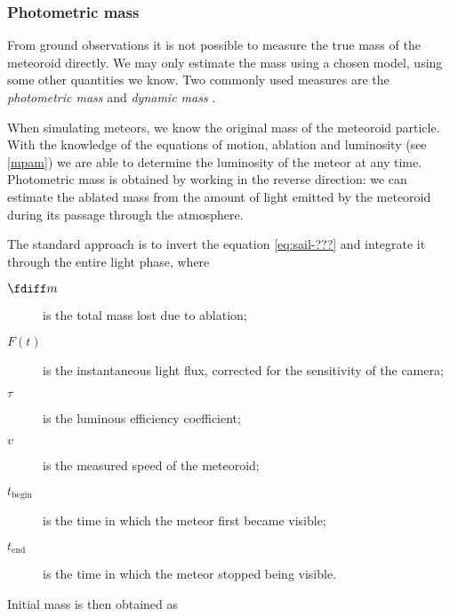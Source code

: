        
        \subsubsection{Photometric mass} \label{msmp}
            From ground observations it is not possible to measure the true mass of the meteoroid directly.
            We may only estimate the mass using a chosen model, using some other quantities we know.
            Two commonly used measures are the \emph{photometric mass} and \emph{dynamic mass} \citep{ceplecha1966}.

            When simulating meteors, we know the original mass of the meteoroid particle.
            With the knowledge of the equations of motion, ablation and luminosity (see \cref{mpam})
            we are able to determine the luminosity of the meteor at any time.
            Photometric mass is obtained by working in the reverse direction: we can estimate the
            ablated mass from the amount of light emitted by the meteoroid during its passage through the atmosphere.

            The standard approach is to invert the equation \cref{eq:sail-???} and integrate it
            through the entire light phase,
            where
            \begin{description}
                \item[$\fdiff m$]
                    is the total mass lost due to ablation;
                \item[$F(t)$]
                    is the instantaneous light flux, corrected for the sensitivity of the camera;
                \item[$\tau$]
                    is the luminous efficiency coefficient;
                \item[$v$]
                    is the measured speed of the meteoroid;
                \item[$t_\mathrm{begin}$]
                    is the time in which the meteor first became visible;
                \item[$t_\mathrm{end}$]
                    is the time in which the meteor stopped being visible.
            \end{description}

            Initial mass is then obtained as

